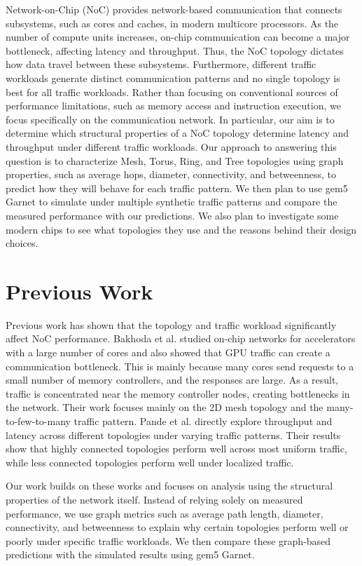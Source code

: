 \documentclass[conference]{IEEEtran}
\begin{document}
Network-on-Chip (NoC) provides network-based communication that connects subsystems, such as cores and caches, in modern multicore processors. As the number of compute units increases, on-chip communication can become a major bottleneck, affecting latency and throughput. Thus, the NoC topology dictates how data travel between these subsystems. Furthermore, different traffic workloads generate distinct communication patterns and no single topology is best for all traffic workloads. Rather than focusing on conventional sources of performance limitations, such as memory access and instruction execution, we focus specifically on the communication network. In particular, our aim is to determine which structural properties of a NoC topology determine latency and throughput under different traffic workloads. Our approach to answering this question is to characterize Mesh, Torus, Ring, and Tree topologies using graph properties, such as average hops, diameter, connectivity, and betweenness, to predict how they will behave for each traffic pattern. We then plan to use gem5 \cite{b3} Garnet \cite{b4} to simulate under multiple synthetic traffic patterns and compare the measured performance with our predictions. We also plan to investigate some modern chips to see what topologies they use and the reasons behind their design choices.


\section{Previous Work}
Previous work has shown that the topology and traffic workload significantly affect NoC performance. Bakhoda et al. \cite{b1} studied on-chip networks for accelerators with a large number of cores and also showed that GPU traffic can create a communication bottleneck. This is mainly because many cores send requests to a small number of memory controllers, and the responses are large. As a result, traffic is concentrated near the memory controller nodes, creating bottlenecks in the network. Their work focuses mainly on the 2D mesh topology and the many-to-few-to-many traffic pattern. Pande et al. \cite{b2} directly explore throughput and latency across different topologies under varying traffic patterns. Their results show that highly connected topologies perform well across most uniform traffic, while less connected topologies perform well under localized traffic.

Our work builds on these works and focuses on analysis using the structural properties of the network itself. Instead of relying solely on measured performance, we use graph metrics such as average path length, diameter, connectivity, and betweenness to explain why certain topologies perform well or poorly under specific traffic workloads. We then compare these graph-based predictions with the simulated results using gem5 Garnet.
\end{document}

